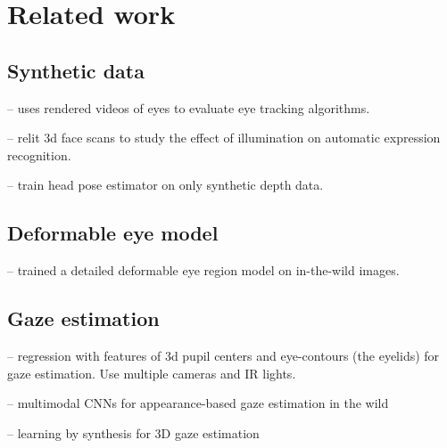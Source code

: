 
\section{Related work}

\subsection{Synthetic data}

\cite{swirski2014rendering} -- uses rendered videos of eyes to evaluate eye tracking algorithms.

\cite{stratou2011effect} -- relit 3d face scans to study the effect of illumination on automatic expression recognition.

\cite{fanelli2011real} -- train head pose estimator on only synthetic depth data.

\subsection{Deformable eye model}

\cite{alabort2014statistically} -- trained a detailed deformable eye region model on in-the-wild images.

\subsection{Gaze estimation}

\cite{xiong2014gaze} -- regression with features of 3d pupil centers and eye-contours (the eyelids) for gaze estimation.  Use multiple cameras and IR lights.

\cite{zhang15_cvpr} -- multimodal CNNs for appearance-based gaze estimation in the wild

\cite{sugano2014learning} -- learning by synthesis for 3D gaze estimation